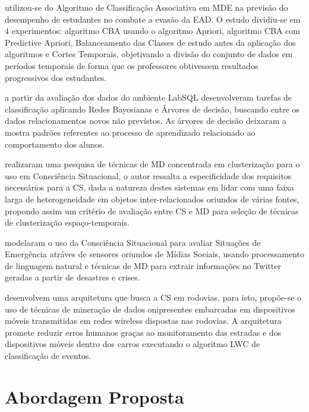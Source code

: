 \documentclass[12pt]{article}
\begin{document}
\cite{Fernandes2017} utilizou-se do Algoritmo de  Classificação Associativa em MDE na previsão do desempenho de estudantes no combate a evasão da EAD. O estudo dividiu-se em 4 experimentos: algoritmo CBA usando o algoritmo Apriori, algoritmo CBA com Predictive Apriori, Balanceamento das Classes de estudo antes da aplicação dos algoritmos e Cortes Temporais, objetivando a divisão do conjunto de dados em períodos temporais de forma que os professores obtivessem resultados progressivos dos estudantes.

\cite{Dias_e_Filho_etal_2008} a partir da avaliação dos dados do ambiente LabSQL desenvolveram tarefas de classificação aplicando Redes Bayesianas e Árvores de decisão, buscando entre os dados relacionamentos novos não previstos. As árvores de decisão deixaram a mostra padrões referentes ao processo de aprendizado relacionado ao comportamento dos alunos. 

\cite{Mitsch_et_al_2013} realizaram uma pesquisa de técnicas de MD concentrada em clusterização para o uso em Consciência Situacional, o autor ressalta a especificidade dos requisitos necessários para a CS, dada a natureza destes sistemas em lidar com uma faixa larga de heterogeneidade em objetos inter-relacionados oriundos de várias fontes, propondo assim um critério de avaliação entre CS e MD para seleção de técnicas de clusterização espaço-temporais.

\cite{Yin_et_al_2012} modelaram o uso da Consciência Situacional para avaliar Situações de Emergência atráves de sensores oriundos de Mídias Sociais, usando processamento de linguagem natural e técnicas de MD para extrair informações no Twitter geradas a partir de desastres e crises.

\cite{Krishnaswamy_et_al_2005} desenvolvem uma arquitetura que busca a CS em rodovias, para isto, propõe-se o uso de técnicas de mineração de dados onipresentes embarcadas em dispositivos móveis transmitidas em redes wireless dispostas nas rodovias. A arquitetura promete reduzir erros humanos graças ao monitoramento das estradas e dos dispositivos móveis dentro dos carros executando o algoritmo LWC de classificação de eventos.

\section{Abordagem Proposta}

\end{document}
